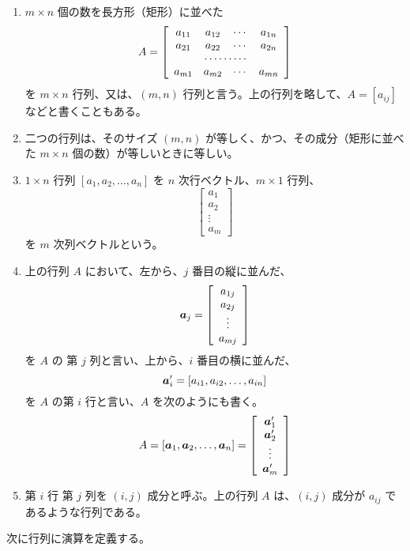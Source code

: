 \begin{definition}
\begin{enumerate}
\item $m\times n$ 個の数を長方形（矩形）に並べた
$$A = \left[\begin{array}{cccc}
a_{11} & a_{12} & \cdots & a_{1n}\\
a_{21} & a_{22} & \cdots & a_{2n} \\
\multicolumn{4}{c}{\cdots\cdots\cdots}\\
a_{m1} & a_{m2} & \cdots & a_{mn} \\
\end{array}
\right]$$
を {\gt $m\times n$ 行列}、又は、$(m,n)$ 行列と言う。上の行列を略して、$A = [a_{ij}]$ などと書くこともある。
\item 二つの行列は、そのサイズ $(m,n)$ が等しく、かつ、その成分（矩形に並べた $m\times n$ 個の数）が等しいときに等しい。
\item $1\times n$ 行列 $[a_1,a_2,\ldots, a_n]$ を {\gt $n$ 次行ベクトル}、$m\times 1$ 行列、
$$\left[\begin{array}{c}a_1\\a_2\\ \vdots\\a_m\end{array}\right]$$
を {\gt $m$ 次列ベクトル}という。
\item 上の行列 $A$ において、左から、$j$ 番目の縦に並んだ、
$$\mbox{\boldmath $a$}_j = \left[\begin{array}{c}a_{1j}\\a_{2j}\\ \vdots\\a_{mj}\end{array}\right]$$
を $A$ の {\gt 第 $j$ 列}と言い、上から、$i$ 番目の横に並んだ、
$$\mbox{\boldmath $a$}_i' = [a_{i1},a_{i2},\ldots,a_{in}]$$
を $A$ の{\gt 第 $i$ 行}と言い、$A$ を次のようにも書く。
$$A = [\mbox{\boldmath $a$}_1,\mbox{\boldmath $a$}_2,\ldots,\mbox{\boldmath $a$}_n] = \left[\begin{array}{c}\mbox{\boldmath $a$}_{1}'\\ \mbox{\boldmath $a$}_{2}'\\ \vdots\\ \mbox{\boldmath $a$}_{m}'\end{array}\right]$$
\item 第 $i$ 行 第 $j$ 列を $(i,j)$ {\gt 成分}と呼ぶ。上の行列 $A$ は、$(i,j)$ 成分が $a_{ij}$ であるような行列である。
\end{enumerate}
\end{definition}

次に行列に演算を定義する。


